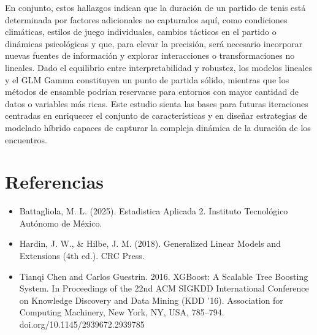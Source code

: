 \documentclass[
  letterpaper,
  DIV=11,
  numbers=noendperiod]{scrartcl}
\begin{document}
En conjunto, estos hallazgos indican que la duración de un partido de
tenis está determinada por factores adicionales no capturados aquí, como
condiciones climáticas, estilos de juego individuales, cambios tácticos
en el partido o dinámicas psicológicas y que, para elevar la precisión,
será necesario incorporar nuevas fuentes de información y explorar
interacciones o transformaciones no lineales. Dado el equilibrio entre
interpretabilidad y robustez, los modelos lineales y el GLM Gamma
constituyen un punto de partida sólido, mientras que los métodos de
ensamble podrían reservarse para entornos con mayor cantidad de datos o
variables más ricas. Este estudio sienta las bases para futuras
iteraciones centradas en enriquecer el conjunto de características y en
diseñar estrategias de modelado híbrido capaces de capturar la compleja
dinámica de la duración de los encuentros.

\hypertarget{referencias}{%
\section{Referencias}\label{referencias}}

\begin{itemize}
\item
  Battagliola, M. L. (2025). Estadistica Aplicada 2. Instituto
  Tecnológico Autónomo de México.
\item
  Hardin, J. W., \& Hilbe, J. M. (2018). Generalized Linear Models and
  Extensions (4th ed.). CRC Press.
\item
  Tianqi Chen and Carlos Guestrin. 2016. XGBoost: A Scalable Tree
  Boosting System. In Proceedings of the 22nd ACM SIGKDD International
  Conference on Knowledge Discovery and Data Mining (KDD '16).
  Association for Computing Machinery, New York, NY, USA, 785--794.
  doi.org/10.1145/2939672.2939785
\end{itemize}
\end{document}

